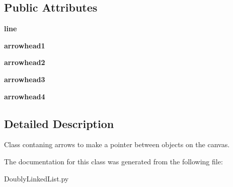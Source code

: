 \subsection*{Public Attributes}
\begin{DoxyCompactItemize}
\item 
\mbox{\label{class_doubly_linked_list_1_1_double_arrow_a67a98331129de5f7d161fb0c5e21fbd3}} 
{\bfseries line}
\item 
\mbox{\label{class_doubly_linked_list_1_1_double_arrow_a7696da1508b3ea4ba72f50de626ade40}} 
{\bfseries arrowhead1}
\item 
\mbox{\label{class_doubly_linked_list_1_1_double_arrow_a88a55772bd6781b9966f6ad55a05a75e}} 
{\bfseries arrowhead2}
\item 
\mbox{\label{class_doubly_linked_list_1_1_double_arrow_a4baf6b1327da189861d909f6a60e01c2}} 
{\bfseries arrowhead3}
\item 
\mbox{\label{class_doubly_linked_list_1_1_double_arrow_add158e74a42dabdfc3babfbfe32e846c}} 
{\bfseries arrowhead4}
\end{DoxyCompactItemize}


\subsection{Detailed Description}
Class contaning arrows to make a pointer between objects on the canvas. 

The documentation for this class was generated from the following file\+:\begin{DoxyCompactItemize}
\item 
Doubly\+Linked\+List.\+py\end{DoxyCompactItemize}
